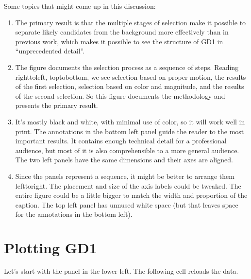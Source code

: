 \documentclass[letterpaper,10pt,english]{sphinxmanual}
\begin{document}
Some topics that might come up in this discussion:
\begin{enumerate}
%
\item {} 
The primary result is that the multiple stages of selection make it possible to separate likely candidates from the background more effectively than in previous work, which makes it possible to see the structure of GD\sphinxhyphen{}1 in “unprecedented detail”.

\item {} 
The figure documents the selection process as a sequence of steps.  Reading right\sphinxhyphen{}to\sphinxhyphen{}left, top\sphinxhyphen{}to\sphinxhyphen{}bottom, we see selection based on proper motion, the results of the first selection, selection based on color and magnitude, and the results of the second selection.  So this figure documents the methodology and presents the primary result.

\item {} 
It’s mostly black and white, with minimal use of color, so it will work well in print.  The annotations in the bottom left panel guide the reader to the most important results.  It contains enough technical detail for a professional audience, but most of it is also comprehensible to a more general audience.  The two left panels have the same dimensions and their axes are aligned.

\item {} 
Since the panels represent a sequence, it might be better to arrange them left\sphinxhyphen{}to\sphinxhyphen{}right.  The placement and size of the axis labels could be tweaked.  The entire figure could be a little bigger to match the width and proportion of the caption.  The top left panel has unnused white space (but that leaves space for the annotations in the bottom left).

\end{enumerate}


\section{Plotting GD\sphinxhyphen{}1}
\label{\detokenize{07_plot:plotting-gd-1}}
Let’s start with the panel in the lower left.  The following cell reloads the data.

\begin{sphinxVerbatim}[commandchars=\\\{\}]
 
   

  
  

  
\end{sphinxVerbatim}
\end{document}
